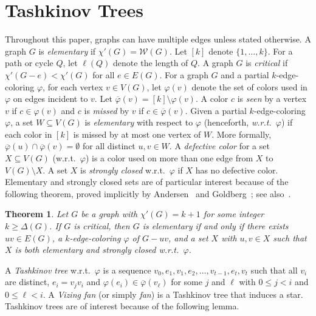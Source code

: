 \documentclass[12pt]{amsart}
\theoremstyle{plain}
\newtheorem{thm}{Theorem}
\theoremstyle{definition}
\theoremstyle{remark}
\newcommand{\fancy}[1]{\mathcal{#1}}
\newcommand{\W}{\fancy{W}}
\newcommand{\vph}{\varphi}
\newcommand{\vphn}{\overline{\varphi}}
\begin{document}
\section{Tashkinov Trees}
Throughout this paper, graphs can have multiple edges unless stated otherwise.
A graph $G$ is \emph{elementary} if $\chi'(G)=\W(G)$. 
Let $[k]$ denote $\{1,\ldots,k\}$.
For a path or cycle $Q$, let \emph{$\ell(Q)$} denote the length of $Q$.
A graph $G$ is \emph{critical} if $\chi'(G-e) < \chi'(G)$ for all $e \in E(G)$. 
For a graph $G$ and a partial $k$-edge-coloring $\varphi$, for each vertex $v\in
V(G)$, let $\varphi(v)$ denote the set of colors used in $\varphi$ on edges
incident to $v$.  Let $\vphn(v)=[k]\setminus\varphi(v)$.  A color $c$ is
\emph{seen} by a vertex $v$ if $c\in \varphi(v)$ and $c$ is \emph{missed} by $v$
if $c\in\vphn(v)$.
Given a partial $k$-edge-coloring $\varphi$, a set $W\subseteq V(G)$ is
\emph{elementary} with respect to $\varphi$ (henceforth,
\emph{w.r.t.~$\varphi$}) if each color in $[k]$ is
missed by at most one vertex of $W$.  More formally, $\vphn(u)\cap
\vphn(v)=\emptyset$ for all distinct $u,v\in W$.
A \emph{defective color} for a set $X\subseteq V(G)$ (w.r.t.~$\varphi$) is a color
used on more than one edge from $X$ to $V(G) \setminus X$.  
A set $X$ is \emph{strongly closed} w.r.t.~$\varphi$ if $X$ has no 
defective color.
Elementary and strongly closed sets are of particular interest because of the
following theorem, proved implicitly by Andersen~\cite{} and Goldberg~\cite{};
see also~\cite[Theorem 1.4]{SSTF}.
% 

\begin{thm}
\label{elementary}
Let $G$ be a graph with $\chi'(G)=k+1$ for some integer $k\ge \Delta(G)$.  If
$G$ is critical, then $G$ is elementary if and only if there exists $uv\in E(G)$,
a $k$-edge-coloring $\vph$ of $G-uv$, and a set $X$ with $u,v\in X$ such
that $X$ is both elementary and strongly closed w.r.t.~$\varphi$.
\end{thm}

A \emph{Tashkinov tree} w.r.t.~$\varphi$ is a sequence $v_0, e_1, v_1,
e_2,\ldots, v_{t-1},e_t,v_t$ such that all $v_i$ are distinct, $e_i=v_jv_i$ and
$\vph(e_i)\in \vphn(v_\ell)$ for some $j$ and $\ell$ with $0\le j< i$ and $0\le
\ell < i$.  
A \emph{Vizing fan} (or simply \emph{fan}) is a Tashkinov tree that induces a
star.  Tashkinov trees are of interest because of the following lemma. 
\end{document}
